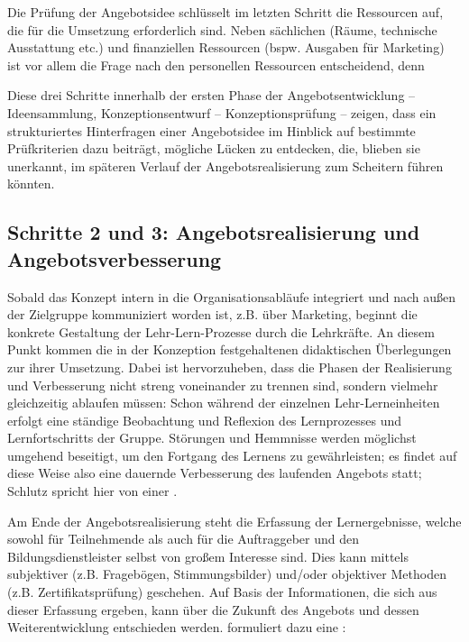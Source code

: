 \documentclass[
  twoside,
  parskip=half-,
]{scrreprt}
\begin{document}
Die Prüfung der Angebotsidee schlüsselt im letzten Schritt die Ressourcen auf, die für die Umsetzung erforderlich sind. Neben sächlichen (Räume, technische Ausstattung etc.) und finanziellen Ressourcen (bspw. Ausgaben für Marketing) ist vor allem die Frage nach den personellen Ressourcen entscheidend, denn 

Diese drei Schritte innerhalb der ersten Phase der Angebotsentwicklung -- Ideensammlung, Konzeptionsentwurf -- Konzeptionsprüfung -- zeigen, dass ein strukturiertes Hinterfragen einer Angebotsidee im Hinblick auf bestimmte Prüfkriterien dazu beiträgt, mögliche Lücken zu entdecken, die, blieben sie unerkannt, im späteren Verlauf der Angebotsrealisierung zum Scheitern führen könnten.


\subsection{Schritte 2 und 3: Angebotsrealisierung und Angebotsverbesserung}

Sobald das Konzept intern in die Organisationsabläufe integriert und nach außen der Zielgruppe kommuniziert worden ist, z.B. über Marketing, beginnt die konkrete Gestaltung der Lehr-Lern-Prozesse durch die Lehrkräfte. An diesem Punkt kommen die in der Konzeption festgehaltenen didaktischen Überlegungen zur ihrer Umsetzung. Dabei ist hervorzuheben, dass die Phasen der Realisierung und Verbesserung nicht streng voneinander zu trennen sind, sondern vielmehr gleichzeitig ablaufen müssen: Schon während der einzelnen Lehr-Lerneinheiten erfolgt eine ständige Beobachtung und Reflexion des Lernprozesses und Lernfortschritts der Gruppe. Störungen und Hemmnisse werden möglichst umgehend beseitigt, um den Fortgang des Lernens zu gewährleisten; es findet auf diese Weise also eine dauernde Verbesserung des laufenden Angebots statt; Schlutz spricht hier von einer .

Am Ende der Angebotsrealisierung steht die Erfassung der Lernergebnisse, welche sowohl für Teilnehmende als auch für die Auftraggeber und den Bildungsdienstleister selbst von großem Interesse sind. Dies kann mittels subjektiver (z.B. Fragebögen, Stimmungsbilder) und/oder objektiver Methoden (z.B. Zertifikatsprüfung) geschehen. Auf Basis der Informationen, die sich aus dieser Erfassung ergeben, kann über die Zukunft des Angebots und dessen Weiterentwicklung entschieden werden. \citeauthor{schlutz} formuliert dazu eine : 
\end{document}
